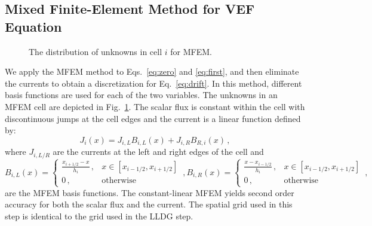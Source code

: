
\subsection{Mixed Finite-Element Method for VEF Equation}
\begin{figure}
	\centering
	 
	\caption{The distribution of unknowns in cell $i$ for MFEM. }
	\label{fig:mfem_grid}
\end{figure}
We apply the MFEM method to Eqs.~\ref{eq:zero} and \ref{eq:first}, and then eliminate the currents to obtain a discretization for Eq.~\ref{eq:drift}.  In this 
method, different basis functions are used for each of the two variables. The unknowns in an MFEM cell are depicted in Fig.~\ref{fig:mfem_grid}. The scalar flux is constant within the cell with discontinuous jumps at the cell edges and the current is a linear function defined by: 
	\begin{equation} \label{eq:MFEM_current}
		J_i(x) = J_{i,L} B_{i,L}(x) + J_{i,R} B_{R,i}(x) \,, 
	\end{equation} 
where $J_{i,L/R}$ are the currents at the left and right edges of the cell and 
	\begin{subequations}
		\begin{equation}
			B_{i,L}(x) = \begin{cases}
				\frac{x_{i+1/2} - x}{h_i} \,, & x \in [x_{i-1/2}, x_{i+1/2}] \\ 
				0 \,, & \text{otherwise}
			\end{cases} \,,
		\end{equation}
		\begin{equation}
			B_{i,R}(x) = \begin{cases}
				\frac{x - x_{i-1/2}}{h_i} \,, & x \in [x_{i-1/2}, x_{i+1/2}] \\ 
				0 \,, & \text{otherwise}
			\end{cases} \,,
		\end{equation}
	\end{subequations}
are the MFEM basis functions. The constant-linear MFEM yields second order accuracy for both the scalar flux and the current. The spatial grid used in this step is identical to the grid used in the LLDG \SN step. 

